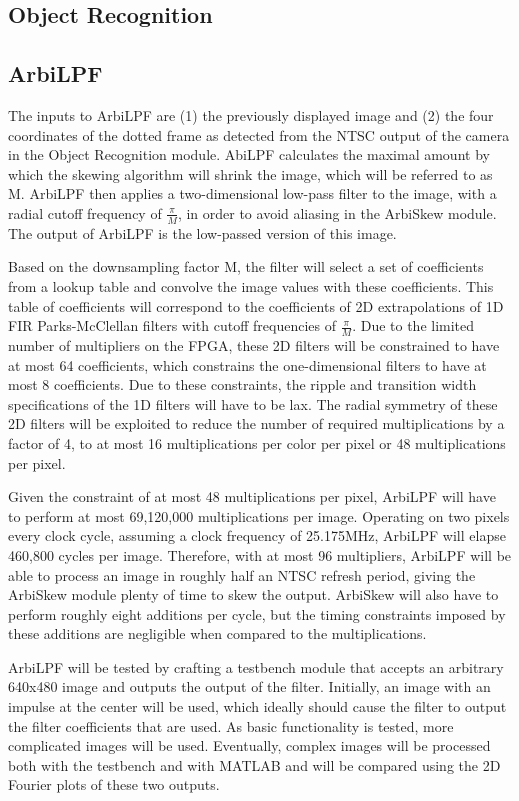 \documentclass{article}
\begin{document}
\subsection{Object Recognition}

\subsection{ArbiLPF}
The inputs to ArbiLPF are (1) the previously displayed image and (2) the four coordinates of the dotted frame as detected from the NTSC output of the camera in the Object Recognition module. AbiLPF calculates the maximal amount by which the skewing algorithm will shrink the image, which will be referred to as M. ArbiLPF then applies a two-dimensional low-pass filter to the image, with a radial cutoff frequency of \( \frac{\pi}{M} \), in order to avoid aliasing in the ArbiSkew module. The output of ArbiLPF is the low-passed version of this image.

Based on the downsampling factor M, the filter will select a set of coefficients from a lookup table and convolve the image values with these coefficients. This table of coefficients will correspond to the coefficients of 2D extrapolations of 1D FIR Parks-McClellan filters with cutoff frequencies of \( \frac{\pi}{M} \). Due to the limited number of multipliers on the FPGA, these 2D filters will be constrained to have at most 64 coefficients, which constrains the one-dimensional filters to have at most 8 coefficients. Due to these constraints, the ripple and transition width specifications of the 1D filters will have to be lax. The radial symmetry of these 2D filters will be exploited to reduce the number of required multiplications by a factor of 4, to at most 16 multiplications per color per pixel or 48 multiplications per pixel.

Given the constraint of at most 48 multiplications per pixel, ArbiLPF will have to perform at most 69,120,000 multiplications per image. Operating on two pixels every clock cycle, assuming a clock frequency of 25.175MHz, ArbiLPF will elapse 460,800 cycles per image. Therefore, with at most 96 multipliers, ArbiLPF will be able to process an image in roughly half an NTSC refresh period, giving the ArbiSkew module plenty of time to skew the output. ArbiSkew will also have to perform roughly eight additions per cycle, but the timing constraints imposed by these additions are negligible when compared to the multiplications.

ArbiLPF will be tested by crafting a testbench module that accepts an arbitrary 640x480 image and outputs the output of the filter. Initially, an image with an impulse at the center will be used, which ideally should cause the filter to output the filter coefficients that are used. As basic functionality is tested, more complicated images will be used. Eventually, complex images will be processed both with the testbench and with MATLAB and will be compared using the 2D Fourier plots of these two outputs.
\end{document}
